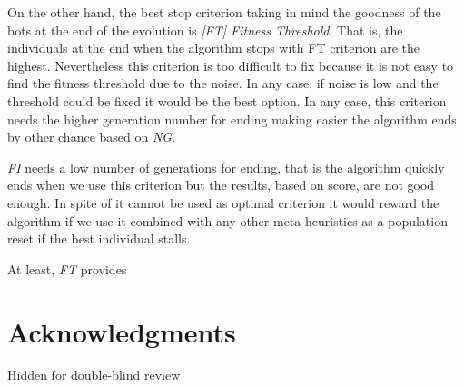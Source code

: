 \documentclass[runningheads,a4paper]{llncs}
\begin{document}
On the other hand, the best stop criterion taking in mind the goodness of the bots at the end of the evolution is \textit{[FT] Fitness Threshold}. That is, the individuals at the end when the algorithm stops with FT criterion are the highest. Nevertheless this criterion is too difficult to fix because it is not easy to find the fitness threshold due to the noise. In any case, if noise is low and the threshold could be fixed it would be the best option. In any case, this criterion needs the higher generation number for ending making easier the algorithm ends by other chance based on \textit{NG}. 


\textit{FI} needs a low number of generations for ending, that is the algorithm quickly ends when we use this criterion but the results, based on score, are not good enough. In spite of it cannot be used as optimal criterion it would reward the algorithm if we use it combined with any other meta-heuristics as a population reset if the best individual stalls.   


At least, \textit{FT} provides  



\section*{Acknowledgments}

Hidden for double-blind review




\end{document}
